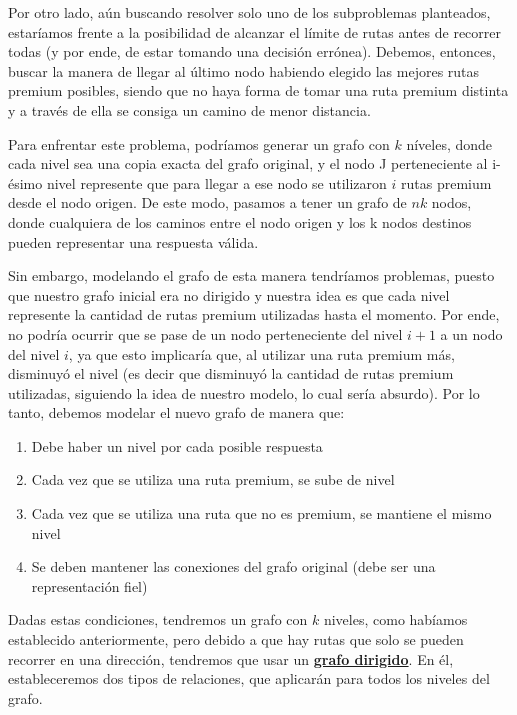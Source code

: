 Por otro lado, aún buscando resolver solo uno de los subproblemas planteados, estaríamos frente a la posibilidad de alcanzar el límite de rutas antes de recorrer todas (y por ende, de estar tomando una decisión errónea). Debemos, entonces, buscar la manera de llegar al último nodo habiendo elegido las mejores rutas premium posibles, siendo que no haya forma de tomar una ruta premium distinta y a través de ella se consiga un camino de menor distancia.

Para enfrentar este problema, podríamos generar un grafo con $k$ níveles, donde cada nivel sea una copia exacta del grafo original, y el nodo J perteneciente al i-ésimo nivel represente que para llegar a ese nodo se utilizaron $i$ rutas premium desde el nodo origen. De este modo, pasamos a tener un grafo de $nk$ nodos, donde cualquiera de los caminos entre el nodo origen y los k nodos destinos pueden representar una respuesta válida.

Sin embargo, modelando el grafo de esta manera tendríamos problemas, puesto que nuestro grafo inicial era no dirigido y nuestra idea es que cada nivel represente la cantidad de rutas premium utilizadas hasta el momento. Por ende, no podría ocurrir que se pase de un nodo perteneciente del nivel $i+1$ a un nodo del nivel $i$, ya que esto implicaría que, al utilizar una ruta premium más, disminuyó el nivel (es decir que disminuyó la cantidad de rutas premium utilizadas, siguiendo la idea de nuestro modelo, lo cual sería absurdo). Por lo tanto, debemos modelar el nuevo grafo de manera que:

\begin{enumerate}
	\item Debe haber un nivel por cada posible respuesta

	\item Cada vez que se utiliza una ruta premium, se sube de nivel

	\item Cada vez que se utiliza una ruta que no es premium, se mantiene el mismo nivel

	\item Se deben mantener las conexiones del grafo original (debe ser una representación fiel)
\end{enumerate}

Dadas estas condiciones, tendremos un grafo con $k$ niveles, como habíamos establecido anteriormente, pero debido a que hay rutas que solo se pueden recorrer en una dirección, tendremos que usar un \underline{\textbf{grafo dirigido}}. En él, estableceremos dos tipos de relaciones, que aplicarán para todos los niveles del grafo.

